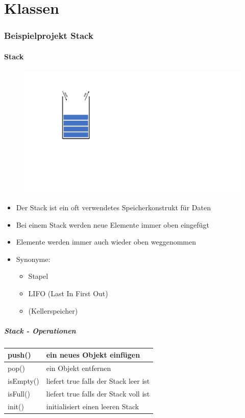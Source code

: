 
\part{Klassen}
\label{sec:Klassen}

\section{Beispielprojekt Stack}
\label{sec:Beispielprojekt Stack}

\subsection{Stack}
\label{Stack}
\noindent
\begin{figure}[hh]
	\centering
	\includegraphics[width=0.2\linewidth]{images/klasse1.pdf}
\end{figure}
\begin{itemize}
	\item Der Stack ist ein oft verwendetes Speicherkonstrukt für Daten
	\item Bei einem Stack werden neue Elemente immer oben eingefügt
	\item Elemente werden immer auch wieder oben weggenommen
	\item Synonyme:
	\begin{itemize}
		\item Stapel
		\item LIFO (Last In First Out)
		\item (Kellerspeicher)
	\end{itemize}
\end{itemize}

\subsubsection{Stack - Operationen}
\label{sec:Stack - Operationen}

\begin{tabular}{ll}
	\hline 
	push() & ein neues Objekt einfügen \\ 
	\hline 
	pop() & ein Objekt entfernen \\ 
	\hline 
	isEmpty() & liefert true falls der Stack leer ist \\ 
	\hline 
	isFull() & liefert true falls der Stack voll ist \\ 
	\hline 
	init() & initialisiert einen leeren Stack \\ 
	\hline 
\end{tabular}

